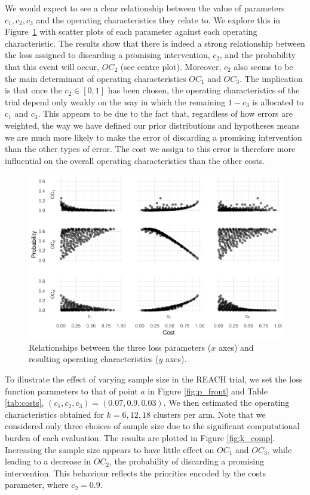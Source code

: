 \documentclass[AMA,STIX1COL]{WileyNJD-v2}
\begin{document}
We would expect to see a clear relationship between the value of parameters $c_1, c_2, c_3$ and the operating characteristics they relate to. We explore this in Figure~\ref{fig:cost_OCs} with scatter plots of each  parameter against each operating characteristic. The results show that there is indeed a strong relationship between the loss assigned to discarding a promising intervention, $c_2$, and the probability that this event will occur, $OC_2$ (see centre plot). Moreover, $c_2$ also seems to be the main determinant of operating characteristics $OC_1$ and $OC_3$. The implication is that once the $c_2 \in [0,1]$ has been chosen, the operating characteristics of the trial depend only weakly on the way in which the remaining $1-c_3$ is allocated to $c_1$ and $c_3$. This appears to be due to the fact that, regardless of how errors are weighted, the way we have defined our prior distributions and hypotheses means we are much more likely to make the error of discarding a promising intervention than the other types of error. The cost we assign to this error is therefore more influential on the overall operating characteristics than the other costs.


\begin{figure}
\centering
\includegraphics[scale=0.8]{./figures/cost_OCs}
\caption{Relationships between the three loss parameters ($x$ axes) and resulting operating characteristics ($y$ axes).}
\label{fig:cost_OCs}
\end{figure}

To illustrate the effect of varying sample size in the REACH trial, we set the loss function parameters to that of point $a$ in Figure \ref{fig:p_front} and Table \ref{tab:costs}, $(c_1, c_2, c_3) = (0.07, 0.9, 0.03)$. We then estimated the operating characteristics obtained for $k = 6, 12, 18$ clusters per arm. Note that we considered only three choices of sample size due to the significant computational burden of each evaluation. The results are plotted in Figure \ref{fig:k_comp}. Increasing the sample size appears to have little effect on $OC_1$ and $OC_3$, while leading to a decrease in $OC_2$, the probability of discarding a promising intervention. This behaviour reflects the priorities encoded by the costs parameter, where $c_2 = 0.9$.
\end{document}

